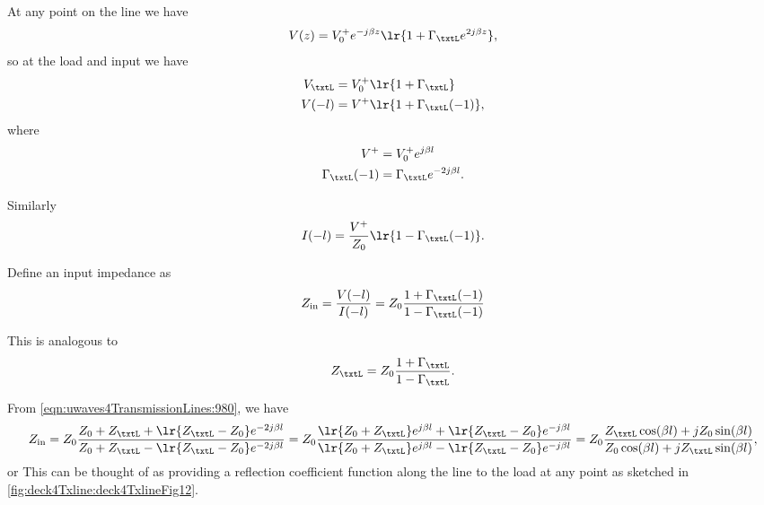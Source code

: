 At any point on the line we have
\begin{dmath}\label{eqn:uwaves4TransmissionLinesCore:1320}
V(z) = V_0^{+} e^{-j \beta z} \lr{ 1 + \Gamma_\txtL e^{2 j \beta z} },
\end{dmath}
so at the load and input we have
\begin{equation}\label{eqn:uwaves4TransmissionLinesCore:1340}
\begin{aligned}
V_\txtL &= V_0^{+} \lr{ 1 + \Gamma_\txtL } \\
V(-l) &= V^{+} \lr{ 1 + \Gamma_\txtL(-1) },
\end{aligned}
\end{equation}
where
\begin{equation}\label{eqn:uwaves4TransmissionLinesCore:1360}
\begin{aligned}
V^{+} &= V_0^{+} e^{ j \beta l } \\
\Gamma_\txtL(-1) &= \Gamma_\txtL e^{-2 j \beta l}.
\end{aligned}
\end{equation}

Similarly
\begin{equation}\label{eqn:uwaves4TransmissionLinesCore:1380}
I(-l) = \frac{V^{+}}{Z_0} \lr{ 1 - \Gamma_\txtL(-1) }.
\end{equation}

Define an input impedance as
\begin{dmath}\label{eqn:uwaves4TransmissionLinesCore:1400}
Z_{\textrm{in}}
= \frac{V(-l)}{I(-l)}
= Z_0 \frac{1 + \Gamma_\txtL(-1)}{1 - \Gamma_\txtL(-1)}
\end{dmath}

This is analogous to
\begin{dmath}\label{eqn:uwaves4TransmissionLinesCore:1420}
Z_\txtL
= Z_0 \frac{1 + \Gamma_\txtL}{1 - \Gamma_\txtL}.
\end{dmath}

From \cref{eqn:uwaves4TransmissionLines:980}, we have
\begin{dmath}\label{eqn:uwaves4TransmissionLinesCore:1440}
Z_{\textrm{in}}
= Z_0 \frac{Z_0 + Z_\txtL + \lr{Z_\txtL - Z_0} e^{-2 j \beta l}}{Z_0 + Z_\txtL - \lr{Z_\txtL - Z_0} e^{-2 j \beta l}}
= Z_0 \frac{\lr{Z_0 + Z_\txtL} e^{j\beta l} + \lr{Z_\txtL - Z_0} e^{- j \beta l}}{\lr{Z_0 + Z_\txtL} e^{j\beta l} - \lr{Z_\txtL - Z_0} e^{- j \beta l}}
= Z_0
\frac
{Z_\txtL \cos( \beta l ) + j Z_0 \sin(\beta l ) }
{Z_0 \cos( \beta l ) + j Z_\txtL \sin(\beta l ) },
\end{dmath}
or
This can be thought of as providing a reflection coefficient function along the line to the load at any point as sketched in \cref{fig:deck4Txline:deck4TxlineFig12}.
